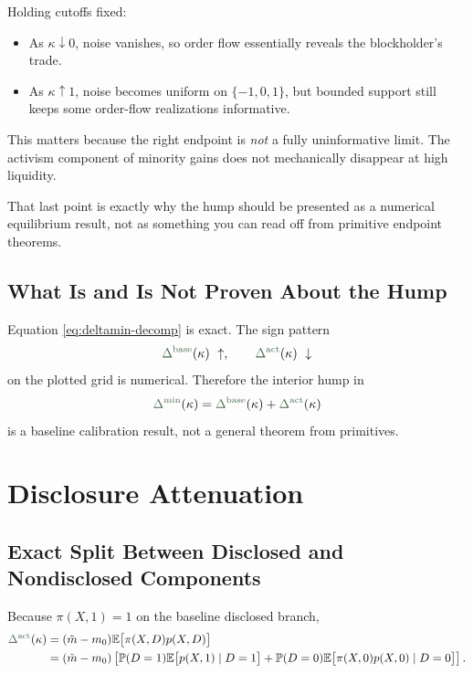 \documentclass[11pt,a4paper]{article}
\theoremstyle{definition}
\theoremstyle{plain}
\theoremstyle{remark}
\newcommand{\E}{\mathbb{E}}
\newcommand{\PP}{\mathbb{P}}
\newcommand{\1}{\mathbf{1}}
\newcommand{\outcome}[1]{{\color{ForestGreen!50!black}#1}}
\begin{document}
Holding cutoffs fixed:
\begin{itemize}
\item As $\kappa \downarrow 0$, noise vanishes, so order flow essentially reveals the blockholder's trade.
\item As $\kappa \uparrow 1$, noise becomes uniform on $\{-1,0,1\}$, but bounded support still keeps some order-flow realizations informative.
\end{itemize}

This matters because the right endpoint is \emph{not} a fully uninformative limit. The activism component of minority gains does not mechanically disappear at high liquidity.

\begin{warningbox}
That last point is exactly why the hump should be presented as a numerical equilibrium result, not as something you can read off from primitive endpoint theorems.
\end{warningbox}

\subsection{What Is and Is Not Proven About the Hump}

Equation \eqref{eq:deltamin-decomp} is exact. The sign pattern
\begin{equation}
\outcome{\Delta^{\textup{base}}}(\kappa)\ \uparrow,
\qquad
\outcome{\Delta^{\textup{act}}}(\kappa)\ \downarrow
\label{eq:hump-sign-pattern}
\end{equation}
on the plotted grid is numerical. Therefore the interior hump in
\begin{equation}
\outcome{\Delta^{\min}}(\kappa)
=
\outcome{\Delta^{\textup{base}}}(\kappa)
+
\outcome{\Delta^{\textup{act}}}(\kappa)
\label{eq:hump-object}
\end{equation}
is a baseline calibration result, not a general theorem from primitives.

\section{Disclosure Attenuation}

\subsection{Exact Split Between Disclosed and Nondisclosed Components}

Because $\pi(X,1)=1$ on the baseline disclosed branch,
\begin{align}
\outcome{\Delta^{\textup{act}}}(\kappa)
&=
(\tilde m-m_0)\E\big[\pi(X,D)p(X,D)\big]
\nonumber\\
&=
(\tilde m-m_0)
\left[
\PP(D=1)\E\big[p(X,1)\mid D=1\big]
+
\PP(D=0)\E\big[\pi(X,0)p(X,0)\mid D=0\big]
\right].
\label{eq:disclosure-split}
\end{align}
\end{document}
